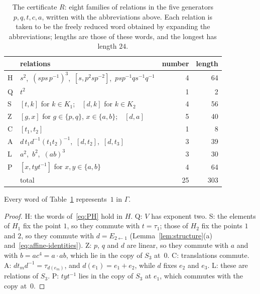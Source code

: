 \begin{table}[ht]
\centering\small
\begin{tabular}{@{}l p{} r r@{}}
\toprule
 & relations & number & length\\
\midrule
\textsf{H} & $s^2$,\ $(sps\,p^{-1})^3$,\ $[s,p^2sp^{-2}]$,\ $psp^{-1}qs^{-1}q^{-1}$ & 4 & 64\\
\textsf{Q} & $t^2$ & 1 & 2\\
\textsf{S} & $[t,k]$ for $k\in K_1$;\ \ $[d,k]$ for $k\in K_2$ & 4 & 56\\
\textsf{Z} & $[g,x]$ for $g\in\{p,q\}$, $x\in\{a,b\}$;\ \ $[d,a]$ & 5 & 40\\
\textsf{C} & $[t_1,t_2]$ & 1 & 8\\
\textsf{A} & $d\,t_1d^{-1}(t_1t_2)^{-1}$,\ $[d,t_2]$,\ $[d,t_3]$ & 3 & 39\\
\textsf{L} & $a^2$,\ $b^2$,\ $(ab)^3$ & 3 & 30\\
\textsf{P} & $[x,tyt^{-1}]$ for $x,y\in\{a,b\}$ & 4 & 64\\
\midrule
 & total & 25 & 303\\
\bottomrule
\end{tabular}
\caption{The certificate $R$: eight families of relations in the five generators $p,q,t,c,a$, written with the abbreviations above. Each
relation is taken to be the freely reduced word obtained by expanding the abbreviations; lengths are those of these words, and the longest has
length $24$.}
\label{tab:certificate}
\end{table}

\begin{lemma}\label{lem:validity}
Every word of Table~\ref{tab:certificate} represents~$1$ in $\Gamma$.
\end{lemma}

\begin{proof}
\textsf{H}: the words of~\eqref{eq:PH} hold in $H$.
\textsf{Q}: $V$ has exponent two.
\textsf{S}: the elements of $H_1$ fix the point $1$, so they commute with $t=\tau_1$; those of $H_2$ fix the points $1$ and $2$, so they commute
with $d=E_{2\leftarrow1}$ (Lemma~\ref{lem:structure}(a) and~\eqref{eq:affine-identities}).
\textsf{Z}: $p$, $q$ and $d$ are linear, so they commute with $a$ and with $b=ac^4=a\cdot ab$, which lie in the copy of $S_3$ at~$0$.
\textsf{C}: translations commute.
\textsf{A}: $dt_md^{-1}=\tau_{d(e_m)}$, and $d(e_1)=e_1+e_2$, while $d$ fixes $e_2$ and $e_3$.
\textsf{L}: these are relations of $S_3$.
\textsf{P}: $tyt^{-1}$ lies in the copy of $S_3$ at $e_1$, which commutes with the copy at~$0$.
\end{proof}

